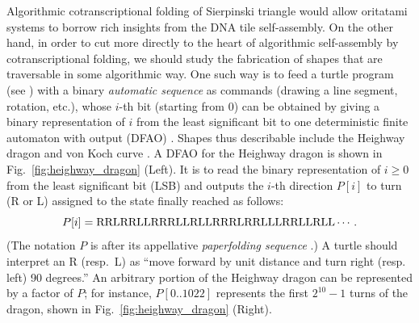 Algorithmic cotranscriptional folding of Sierpinski triangle would allow oritatami systems to borrow rich insights from the DNA tile self-assembly. 
On the other hand, in order to cut more directly to the heart of algorithmic self-assembly by cotranscriptional folding, we should study the fabrication of shapes that are traversable in some algorithmic way. 
One such way is to feed a turtle program (see \cite{AbelsondiSessa1981}) with a binary \textit{automatic sequence} as commands (drawing a line segment, rotation, etc.), whose $i$-th bit (starting from 0) can be obtained by giving a binary representation of $i$ from the least significant bit to one deterministic finite automaton with output (DFAO) \cite{AlloucheShallit2003}.
Shapes thus describable include the Heighway dragon \cite{AlloucheShallit2003} and von Koch curve \cite{MaHoldener2005}. 
A DFAO for the Heighway dragon is shown in Fig.~\ref{fig:heighway_dragon} (Left). 
It is to read the binary representation of $i \ge 0$ from the least significant bit (LSB) and outputs the $i$-th direction $P[i]$ to turn (R or L) assigned to the state finally reached as follows: 
\[
P[i] 	= {\rm RRLRRLLRRRLLRLLRRRLRRLLLRRLLRLL} \cdots.
\]
(The notation $P$ is after its appellative \textit{paperfolding sequence} \cite{AlloucheShallit2003}.) 
A turtle should interpret an R (resp.~L) as ``move forward by unit distance and turn right (resp. left) 90 degrees.''
An arbitrary portion of the Heighway dragon can be represented by a factor of $P$; for instance, $P[0 .. 1022]$ represents the first $2^{10}-1$ turns of the dragon, shown in Fig.~\ref{fig:heighway_dragon} (Right). 

